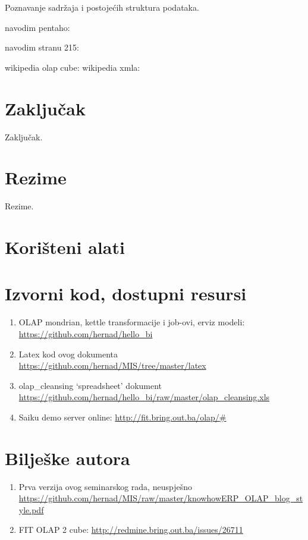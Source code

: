 \documentclass[times, utf8, seminar]{fit}
\begin{document}
Poznavanje sadržaja i postojećih struktura podataka.



navodim pentaho: \cite{pentaho32}

navodim stranu 215: \cite[str.~215]{pentaho32}

wikipedia olap cube: \cite{web:wikipedia:olap_cube}
wikipedia xmla: \cite{web:wikipedia:xmla}

\chapter{Zaključak}
Zaključak.




\chapter{Rezime}
Rezime.

\appendix

\chapter{Korišteni alati}

\chapter{Izvorni kod, dostupni resursi}
\label{chap:izvorni_kod}

\begin{enumerate}[labelindent=\parindent,leftmargin=*]
   \item OLAP mondrian, kettle transformacije i job-ovi, erviz modeli: \url{https://github.com/hernad/hello_bi}
   \item Latex kod ovog dokumenta \url{https://github.com/hernad/MIS/tree/master/latex}
   \item olap\_cleansing `spreadsheet' dokument \url{https://github.com/hernad/hello_bi/raw/master/olap_cleansing.xls}
   \item Saiku demo server online: \url{http://fit.bring.out.ba/olap/#}
\end{enumerate}

\chapter{Bilješke autora}

\begin{enumerate}
  \item Prva verzija ovog seminarskog rada, neuspješno \url{https://github.com/hernad/MIS/raw/master/knowhowERP_OLAP_blog_style.pdf}
  \item FIT OLAP 2 cube: \url{http://redmine.bring.out.ba/issues/26711}
\end{enumerate}
\end{document}
